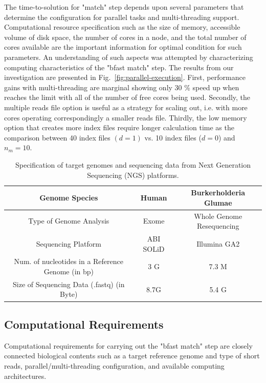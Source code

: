 \documentclass[12pt]{article}
\begin{document}
The time-to-solution for "match" step depends upon several parameters that determine the configuration for parallel tasks and multi-threading support.  Computational resource specification such as the size of memory, accessible volume of disk space, the number of cores in a node, and the total number of cores available are the important information for optimal condition for such parameters.  An understanding of such aspects was attempted by characterizing computing characteristics of the "bfast match" step.  The results from our investigation are presented  in Fig.~\ref{fig:parallel-execution}. First, performance gains with multi-threading are marginal showing only 30 \% speed up when reaches the limit with all of the number of free cores being used.  
Secondly, the multiple reads file option is useful as a strategy for scaling out, i.e. with more cores operating correspondingly a smaller reads file.  Thirdly, the low memory option that creates more index files require longer calculation time as the comparison between 40 index files $(d = 1)$ vs. 10 index files ($ d = 0 $) and $n_m = 10$.   





\begin{table}
\begin{tabular}{|c|cc|} 
  \hline 
  Genome Species & Human  & Burkerholderia Glumae  \\ \hline
  Type of Genome Analysis &  Exome  & Whole Genome Resequencing \\
  Sequencing Platform & ABI SOLiD  &  Illumina GA2 \\
  Num. of nucleotides in a Reference Genome (in bp) &  3 G & 7.3 M \\
  Size of Sequencing Data (.fastq) (in Byte) & 8.7G & 5.4 G \\

\hline
\end{tabular} \caption{Specification of target genomes and sequencing data from Next Generation Sequencing (NGS) platforms.}
 \label{table:two-genomes} 
\end{table}

\subsection{Computational Requirements}

Computational requirements for carrying out the "bfast match" step are closely connected biological contents such as a target reference genome and type of short reads, parallel/multi-threading configuration, and available computing architectures.  
\end{document}
